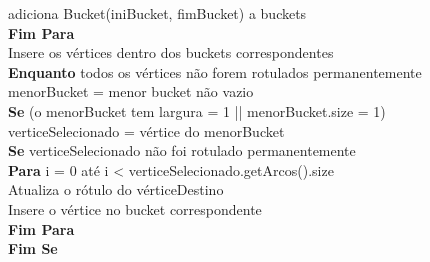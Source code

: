 {\begin{minipage}{70ex}
\vspace*{-1mm} \phantom{} \hspace{6ex} adiciona Bucket(iniBucket, fimBucket) a buckets\\
\vspace*{-1mm} \phantom{} \hspace{3ex} {\bf Fim Para}\\
\vspace*{-1mm} \phantom{} \hspace{3ex} Insere os vértices dentro dos buckets correspondentes\\
\vspace*{-1mm} \phantom{} \hspace{3ex} {\bf Enquanto} todos os vértices não forem rotulados permanentemente\\
\vspace*{-1mm} \phantom{} \hspace{6ex} menorBucket = menor bucket não vazio\\
\vspace*{-1mm} \phantom{} \hspace{6ex} {\bf Se} (o menorBucket tem largura = 1 || menorBucket.size = 1)\\
\vspace*{-1mm} \phantom{} \hspace{9ex} verticeSelecionado = vértice do menorBucket\\
\vspace*{-1mm} \phantom{} \hspace{9ex} {\bf Se} verticeSelecionado não foi rotulado permanentemente\\
\vspace*{-1mm} \phantom{} \hspace{12ex} {\bf Para} i = 0 até i < verticeSelecionado.getArcos().size\\
\vspace*{-1mm} \phantom{} \hspace{15ex} Atualiza o rótulo do vérticeDestino\\
\vspace*{-1mm} \phantom{} \hspace{15ex} Insere o vértice no bucket correspondente\\
\vspace*{-1mm} \phantom{} \hspace{12ex} {\bf Fim Para}\\
\vspace*{-1mm} \phantom{} \hspace{9ex} {\bf Fim Se}\\

\end{minipage}}
